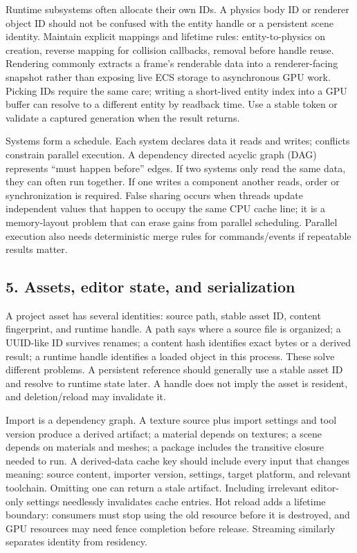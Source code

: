 Runtime subsystems often allocate their own IDs. A physics body ID or renderer object ID should not be confused with the entity handle or a persistent scene identity. Maintain explicit mappings and lifetime rules: entity-to-physics on creation, reverse mapping for collision callbacks, removal before handle reuse. Rendering commonly extracts a frame's renderable data into a renderer-facing snapshot rather than exposing live ECS storage to asynchronous GPU work. Picking IDs require the same care; writing a short-lived entity index into a GPU buffer can resolve to a different entity by readback time. Use a stable token or validate a captured generation when the result returns.

Systems form a schedule. Each system declares data it reads and writes; conflicts constrain parallel execution. A dependency directed acyclic graph (DAG) represents ``must happen before'' edges. If two systems only read the same data, they can often run together. If one writes a component another reads, order or synchronization is required. False sharing occurs when threads update independent values that happen to occupy the same CPU cache line; it is a memory-layout problem that can erase gains from parallel scheduling. Parallel execution also needs deterministic merge rules for commands/events if repeatable results matter.

\subsection{5. Assets, editor state, and serialization}\label{05-engine-i-ch008-assets-editor-state-and-serialization}

\hypertarget{05-engine-i-ch008-assets-editor-state-and-serialization}{}

A project asset has several identities: source path, stable asset ID, content fingerprint, and runtime handle. A path says where a source file is organized; a UUID-like ID survives renames; a content hash identifies exact bytes or a derived result; a runtime handle identifies a loaded object in this process. These solve different problems. A persistent reference should generally use a stable asset ID and resolve to runtime state later. A handle does not imply the asset is resident, and deletion/reload may invalidate it.

Import is a dependency graph. A texture source plus import settings and tool version produce a derived artifact; a material depends on textures; a scene depends on materials and meshes; a package includes the transitive closure needed to run. A derived-data cache key should include every input that changes meaning: source content, importer version, settings, target platform, and relevant toolchain. Omitting one can return a stale artifact. Including irrelevant editor-only settings needlessly invalidates cache entries. Hot reload adds a lifetime boundary: consumers must stop using the old resource before it is destroyed, and GPU resources may need fence completion before release. Streaming similarly separates identity from residency.

